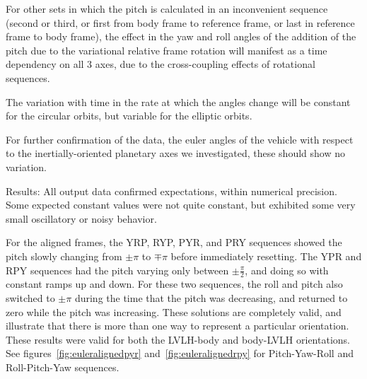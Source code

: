 \begin{description}
For other sets in which the pitch is calculated in an inconvenient sequence (second or third, or first from body frame to reference frame, or last in reference frame to body frame), the effect in the yaw and roll angles of the addition of the pitch due to the variational relative frame rotation will manifest as a time dependency on all 3 axes, due to the cross-coupling effects of rotational sequences.

The variation with time in the rate at which the angles change will be constant for the circular orbits, but variable for the elliptic orbits.

For further confirmation of the data, the euler angles of the vehicle with respect to the inertially-oriented planetary axes we investigated, these should show no variation.

\item{Results:}
All output data confirmed expectations, within numerical precision.  Some expected constant values were not quite constant, but exhibited some very small oscillatory or noisy behavior.  

For the aligned frames, the YRP, RYP, PYR, and PRY sequences showed the pitch slowly changing  from $\pm \pi$ to $\mp \pi$ before immediately resetting.  The YPR and RPY sequences had the pitch varying only between $\pm \frac{\pi}{2}$, and doing so with constant ramps up and down.  For these two sequences, the roll and pitch also switched to $\pm \pi$ during the time that the pitch was decreasing, and returned to zero while the pitch was increasing.  These solutions are completely valid, and illustrate that there is more than one way to represent a particular orientation.  These results were valid for both the LVLH-body and body-LVLH orientations. See figures~\ref{fig:euleralignedpyr} and~\ref{fig:euleralignedrpy} for Pitch-Yaw-Roll and Roll-Pitch-Yaw sequences.


\end{description}
